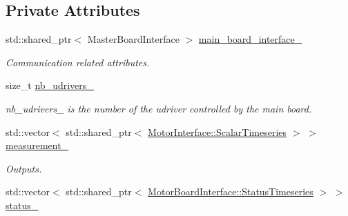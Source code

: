 \subsection*{Private Attributes}
\begin{DoxyCompactItemize}
\item 
std\+::shared\+\_\+ptr$<$ Master\+Board\+Interface $>$ \hyperlink{classblmc__drivers_1_1SpiBus_aa5505729650a363fc5ea2d03c27f0b90}{main\+\_\+board\+\_\+interface\+\_\+}
\begin{DoxyCompactList}\small\item\em Communication related attributes. \end{DoxyCompactList}\item 
size\+\_\+t \hyperlink{classblmc__drivers_1_1SpiBus_ad6f453d80f7c40994d7c2d770e0bcb7a}{nb\+\_\+udrivers\+\_\+}\hypertarget{classblmc__drivers_1_1SpiBus_ad6f453d80f7c40994d7c2d770e0bcb7a}{}\label{classblmc__drivers_1_1SpiBus_ad6f453d80f7c40994d7c2d770e0bcb7a}

\begin{DoxyCompactList}\small\item\em nb\+\_\+udrivers\+\_\+ is the number of the udriver controlled by the main board. \end{DoxyCompactList}\item 
std\+::vector$<$ std\+::shared\+\_\+ptr$<$ \hyperlink{classblmc__drivers_1_1MotorInterface_a49b8fc916b9f9debbd7b0988463db5cd}{Motor\+Interface\+::\+Scalar\+Timeseries} $>$ $>$ \hyperlink{classblmc__drivers_1_1SpiBus_ae3ad20f9cd7e06585b3af84697870cfa}{measurement\+\_\+}
\begin{DoxyCompactList}\small\item\em Outputs. \end{DoxyCompactList}\item 
std\+::vector$<$ std\+::shared\+\_\+ptr$<$ \hyperlink{classblmc__drivers_1_1MotorBoardInterface_ae3777e484dda60c4abe87f2b542ddfb8}{Motor\+Board\+Interface\+::\+Status\+Timeseries} $>$ $>$ \hyperlink{classblmc__drivers_1_1SpiBus_a6a39a07f72d977243eac5346ae4cabba}{status\+\_\+}\hypertarget{classblmc__drivers_1_1SpiBus_a6a39a07f72d977243eac5346ae4cabba}{}\label{classblmc__drivers_1_1SpiBus_a6a39a07f72d977243eac5346ae4cabba}


\end{DoxyCompactItemize}
